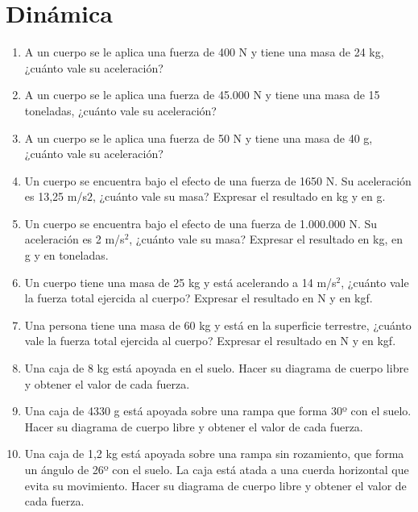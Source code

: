 \section{Dinámica}

\begin{enumerate}
\item A un cuerpo se le aplica una fuerza de 400 N y tiene una masa de 24 kg, ¿cuánto vale su aceleración?

\item A un cuerpo se le aplica una fuerza de 45.000 N y tiene una masa de 15 toneladas, ¿cuánto vale su aceleración?

\item A un cuerpo se le aplica una fuerza de 50 N y tiene una masa de 40 g, ¿cuánto vale su aceleración?

\item Un cuerpo se encuentra bajo el efecto de una fuerza de 1650 N. Su aceleración es 13,25 m/s$2$, ¿cuánto vale su masa? Expresar el resultado en kg y en g. %

\item Un cuerpo se encuentra bajo el efecto de una fuerza de 1.000.000 N. Su aceleración es 2 m/s$^2$, ¿cuánto vale su masa? Expresar el resultado en kg, en g y en toneladas. %

\item Un cuerpo tiene una masa de 25 kg y está acelerando a 14 m/s$^2$, ¿cuánto vale la fuerza total ejercida al cuerpo? Expresar el resultado en N y en kgf. %

\item Una persona tiene una masa de 60 kg y está en la superficie terrestre, ¿cuánto vale la fuerza total ejercida al cuerpo? Expresar el resultado en N y en kgf. %

\item Una caja de 8 kg está apoyada en el suelo. Hacer su diagrama de cuerpo libre y obtener el valor de cada fuerza.

\item Una caja de 4330 g está apoyada sobre una rampa que forma 30º con el suelo. Hacer su diagrama de cuerpo libre y obtener el valor de cada fuerza.

\item Una caja de 1,2 kg está apoyada sobre una rampa sin rozamiento, que forma un ángulo de 26º con el suelo. La caja está atada a una cuerda horizontal que evita su movimiento. Hacer su diagrama de cuerpo libre y obtener el valor de cada fuerza.

\end{enumerate}

